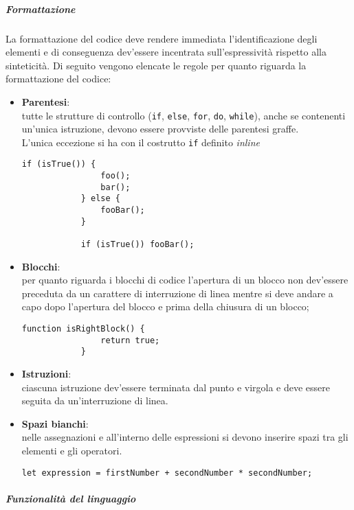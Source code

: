 \subparagraph{Formattazione}

La formattazione del codice deve rendere immediata l'identificazione degli elementi e di conseguenza dev'essere incentrata sull'espressività
rispetto alla sinteticità.
Di seguito vengono elencate le regole per quanto riguarda la formattazione del codice:
\begin{itemize}
	\item \textbf{Parentesi}:\\
		tutte le strutture di controllo (\texttt{if}, \texttt{else}, \texttt{for}, \texttt{do}, \texttt{while}), anche se contenenti
		un'unica istruzione, devono essere provviste delle parentesi graffe.\\

		L'unica eccezione si ha con il costrutto \texttt{if} definito \emph{inline}\\

		\begin{lstlisting}[style=htmlcssjs]
			if (isTrue()) {
				foo();
				bar();
			} else {
				fooBar();
			}

			if (isTrue()) fooBar();
		\end{lstlisting}

	\item \textbf{Blocchi}:\\
		per quanto riguarda i blocchi di codice l'apertura di un blocco non dev'essere preceduta da un carattere di interruzione di linea
		mentre si deve andare a capo dopo l'apertura del blocco e prima della chiusura di un blocco;
		\begin{lstlisting}[style=htmlcssjs]
			function isRightBlock() {
				return true;
			}
		\end{lstlisting}

	\item \textbf{Istruzioni}:\\
		ciascuna istruzione dev'essere terminata dal punto e virgola e deve essere seguita da un'interruzione di linea.

	\item \textbf{Spazi bianchi}:\\
		nelle assegnazioni e all'interno delle espressioni si devono inserire spazi tra gli elementi e gli operatori.
		\begin{lstlisting}[style=htmlcssjs]
			let expression = firstNumber + secondNumber * secondNumber;
		\end{lstlisting}
\end{itemize}

\subparagraph{Funzionalità del linguaggio}

